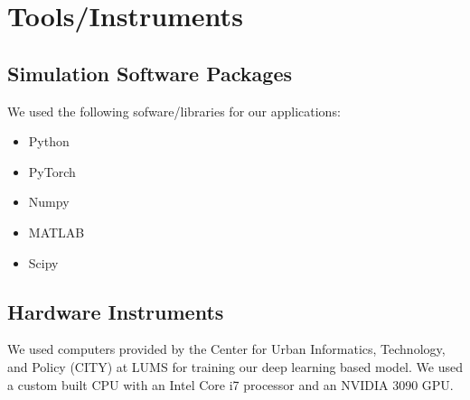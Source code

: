 \section{ Tools/Instruments}
\subsection{Simulation Software Packages}
We used the following sofware/libraries for our applications:
\begin{itemize}

\item Python
\item PyTorch
\item Numpy
\item MATLAB
\item Scipy

\end{itemize}
\subsection{Hardware Instruments}
We used computers provided by the Center for Urban Informatics, Technology, and Policy (CITY) at LUMS for training our deep learning based model. We used a custom built CPU with an Intel Core i7 processor and an NVIDIA 3090 GPU.